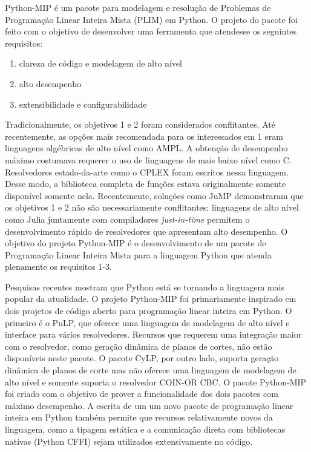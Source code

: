 \documentclass[a4paper,11pt,fleqn]{article}
\begin{document}
Python-MIP é um pacote para modelagem e resolução de Problemas de
Programação Linear Inteira Mista (PLIM)\cite{Wolsey1998} em Python.
O projeto do pacote foi feito com o objetivo de desenvolver uma ferramenta
que atendesse os seguintes requisitos:
\begin{enumerate}
\item clareza de código e modelagem de alto nível
\item alto desempenho
\item extensibilidade e configurabilidade
\end{enumerate}
Tradicionalmente, os objetivos 1 e 2 foram considerados conflitantes.
Até recentemente, as opções mais recomendada para os interessados
em 1 eram linguagens algébricas de alto nível como AMPL\cite{Fourer1987}.
A obtenção de desempenho máximo costumava requerer o uso de linguagens
de mais baixo nível como C\cite{Johnson1991a}. Resolvedores estado-da-arte
como o CPLEX\cite{Bixby2002} foram escritos nessa linguagem. Desse
modo, a biblioteca completa de funções estava originalmente somente
disponível somente nela. Recentemente, soluções como JuMP\cite{Dunning2015}
demonstraram que os objetivos 1 e 2 não são necessariamente conflitantes:
linguagens de alto nível como Julia juntamente com compiladores \emph{just-in-time}
permitem o desenvolvimento rápido de resolvedores que apresentam alto
desempenho. O objetivo do projeto Python-MIP é o desenvolvimento de
um pacote de Programação Linear Inteira Mista para a linguagem Python
que atenda plenamente os requisitos 1-3.

Pesquisas recentes mostram que Python está se tornando a linguagem
mais popular da atualidade\cite{pythonEconomist2018}. O projeto Python-MIP
foi primariamente inspirado em dois projetos de código aberto para
programação linear inteira em Python. O primeiro é o PuLP\cite{Mitchell2009},
que oferece uma linguagem de modelagem de alto nível e interface para
vários resolvedores. Recursos que requerem uma integração maior com
o resolvedor, como geração dinâmica de planos de cortes, não estão
disponíveis neste pacote. O pacote CyLP, por outro lado, suporta geração
dinâmica de planos de corte mas não oferece uma linguagem de modelagem
de alto nível\cite{Towhidi2016} e somente suporta o resolvedor COIN-OR
CBC\cite{Forrest2005}. O pacote Python-MIP foi criado com o objetivo
de prover a funcionalidade dos dois pacotes com máximo desempenho.
A escrita de um um novo pacote de programação linear inteira em Python
também permite que recursos relativamente novos da linguagem, como
a tipagem estática e a comunicação direta com bibliotecas nativas
(Python CFFI) sejam utilizados extensivamente no código.
\end{document}
